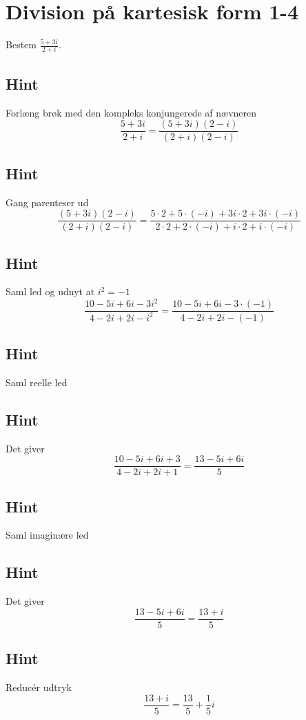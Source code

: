 \documentclass{article}
\newenvironment{exercise}[1]{\newpage\section{#1}}{}
\newcommand{\answerbox}[1]{\fbox{$#1$}}
\newcommand{\hint}{\subsection*{Hint}}
\begin{document}
\begin{exercise}{Division på kartesisk form 1-4}
	
	Bestem $\frac{5+3i}{2+i}$.
	
	\answerbox{\frac{13}{5} + \frac{1}{5}i}
	
	
	\hint 
	
	Forlæng brøk med den kompleks konjungerede af nævneren
	\[
	\frac{5+3i}{2+i} = \frac{(5+3i)(2-i)}{(2+i)(2-i)}
	\]
	
	\hint
	
	Gang parenteser ud
	\[
	\frac{(5+3i)(2-i)}{(2+i)(2-i)} = \frac{5 \cdot 2 + 5 \cdot (-i) + 3i \cdot 2 + 3i \cdot (-i)}{2 \cdot 2 + 2 \cdot (-i) + i \cdot 2 + i \cdot (-i)}
	\]
	
	\hint 
	
	Saml led og udnyt at $i^2 = -1$
	\[
	\frac{10 -5i + 6i -3i^2}{4 - 2i +2i -i^2} = \frac{10 -5i + 6i -3 \cdot (-1)}{4 - 2i +2i -(-1)} 
	\]
	
	\hint
	
	Saml reelle led
	
	\hint
	
	Det giver
	\[
	\frac{10 -5i +6i+3}{4 -2i+2i +1} = \frac{13 - 5i +6i}{5}
	\]
	
	\hint
	
	Saml imaginære led
	
	
	\hint
	
	Det giver 
	\[
	\frac{13 - 5i +6i}{5} = \frac{13 +i}{5}
	\]
	
	\hint
	
	Reducér udtryk
	\[
	\frac{13 +i}{5} = \frac{13}{5} + \frac{1}{5}i
	\]
	
\end{exercise}

\newpage
\end{document}
